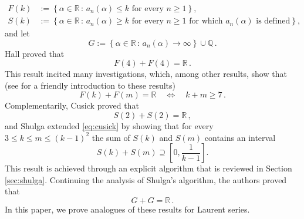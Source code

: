 \documentclass[a4paper,12pt]{article}
\def\sep{\,:\,}
\def\defeq{:=}
\def\bbn{\mathbb{N}}
\def\bbq{\mathbb{Q}}
\def\bbr{\mathbb{R}}
\def\defeq{:=}
\newcommand{\DG}[1]{
\begin{tcolorbox}[colback=green,colframe=black]
   {\textbf{DG: #1}}
\end{tcolorbox}
}
\begin{document}
\begin{equation}\label{eq:FS}
\begin{aligned}
F(k)&\defeq\left\{\alpha\in\bbr\sep a_n(\alpha)\le k \textrm{ for every $n\geq1$}\right\},\\
S(k)&\defeq\left\{\alpha\in\bbr\sep a_n(\alpha)\ge k \textrm{ for every $n\geq1$ for which $a_n(\alpha)$ is defined}\right\},
\end{aligned}
\end{equation}
and let
\begin{equation}\label{eq:G}
    G\defeq\left\{\alpha\in\bbr\sep a_n(\alpha)\to\infty\right\}\cup\bbq\,.
\end{equation}
Hall \cite{hall} proved that 
\begin{equation}\label{thm:hall}
F(4)+F(4) = \bbr\,.
\end{equation}
This result incited many investigations, which, among other results, show that (see \cite{astel} for a friendly introduction to these results)
\begin{equation}\label{eq:hall}
F(k)+F(m) = \bbr\quad\iff\quad k+m\geq 7\,.
\end{equation}
Complementarily, Cusick \cite{cusick} proved that 
\begin{equation}\label{eq:cusick}
S(2)+S(2) = \bbr\,,
\end{equation}
and Shulga \cite{shulga} extended \eqref{eq:cusick} by showing that for every $3\leq k \leq m\leq (k-1)^2$ the sum of $S(k)$ and $S(m)$ contains an interval
\begin{equation}\label{eq:shulga}
S(k) + S(m)\supseteq \left[0,\frac{1}{k-1}\right].
\end{equation}
This result is achieved through an explicit algorithm that is reviewed in Section \ref{sec:shulga}. Continuing the analysis of Shulga's algorithm, the authors \cite{GN} proved that
\begin{equation}\label{eq:GN}
    G+G=\bbr\,.
\end{equation}
In this paper, we prove analogues of these results for Laurent series.
\end{document}
